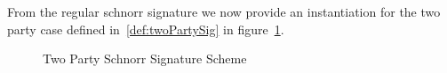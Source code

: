 From the regular schnorr signature we now provide an instantiation for the two party case defined in~\ref{def:twoPartySig} in figure~\ref{fig:twoparty-schnorr}.

\begin{figure}
    \begin{center}
        \fbox{
            \begin{varwidth}{\textwidth}
                \procedure[linenumbering, syntaxhighlight=auto]{$\procSetupPartSig{\varSecParam}$}{
                    \varNonce \sample \cnstIntegersPrimeWithoutZero{\varPrime} \\
                    \varRand \opAssign \funGen{\varRand} \\
                    \pcreturn (\varNonce \opSeperate \varRand)
                }
                \procedure[linenumbering, syntaxhighlight=auto]{$\procGenPartSig{\varMsg}{\varSecKeyAlice}{\varNonceAlice}{\varPubKeyBob}{\varRandBob}$} {
                    \varSchnorrChallenge \opAssign \funHash{\varMsg \opConc \varRandAlice \opAddPoint \varRandBob \opConc \varPubKeyAlice \opAddPoint \varPubKeyBob} \\
                    \varS \opAssign \varNonceAlice \opAddScalar \varSchnorrChallenge \opTimesScalar \varSecKeyAlice \\
                    \pcreturn \varSigAlice \opAssign \varS
                } \\
                \procedure[linenumbering, syntaxhighlight=auto]{$\procVerfPartSig{\varMsg}{\varSecKeyAlice}{\varNonceAlice}{\varPubKeyBob}{\varRandBob}{\varSigBob}$} {
                    \varSchnorrChallenge \opAssign \funHash{\varMsg \opConc \varRandAlice \opAddPoint \varRandBob \opConc \varPubKeyAlice \opAddPoint \varPubKeyBob} \\
                    \varS \opAssign \opAccess{\varSigBob}{\varS} \\
                    \pcreturn \funGen{\varS} \opEq \opPointScalar{\varRandBob}{\varSchnorrChallenge} \opAddPoint \varPubKeyBob
                } \\
                \procedure[linenumbering, syntaxhighlight=auto]{$\procFinSig{\varSigAlice}{\varSigBob}{\varRandAlice}{\varRandBob}$} {
                    \varS_\varAlice \opAssign \opAccess{\varSigAlice}{\varS} \\
                    \varS_\varBob \opAssign \opAccess{\varSigBob}{\varS} \\
                    \pcreturn \varSigFin \opAssign (\varS \opAssign \varS_\varAlice \opAddScalar \varS_\varBob \opSeperate \varRand \opAssign \varRandAlice \opAddPoint \varRandBob)
                }
            \end{varwidth}
        }
    \end{center}
    \caption{Two Party Schnorr Signature Scheme}
    \label{fig:twoparty-schnorr}
\end{figure}

